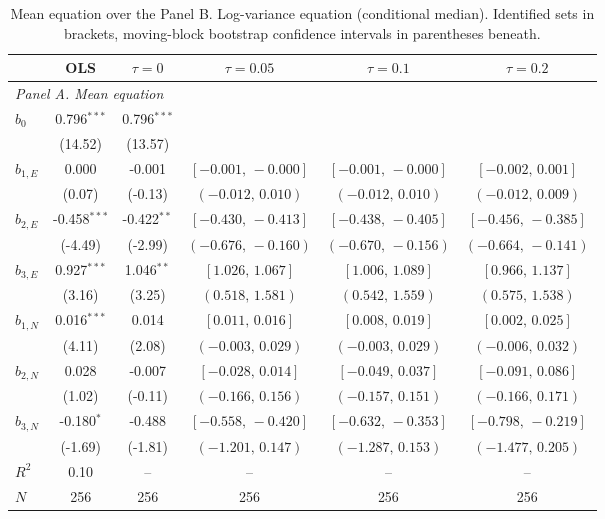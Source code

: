 \documentclass[11pt]{article}
\begin{document}
\begin{table}[!htbp]
\centering
\begin{threeparttable}
\caption{Mean equation over the Panel B. Log-variance equation (conditional median). Identified sets in brackets, moving-block bootstrap confidence intervals in parentheses beneath.}
\label{tab:log_var_eq_panel_lad}
\scriptsize\setlength{\tabcolsep}{3pt}
\begin{tabular}{lccccc}
\toprule
 & OLS & $\tau{=}0$ & $\tau{=}0.05$ & $\tau{=}0.1$ & $\tau{=}0.2$ \\
\midrule
\multicolumn{6}{l}{\textit{Panel A. Mean equation}} \\
\midrule
$b_0$ & 0.796$^{***}$ & 0.796$^{***}$ &  &  &  \\
 & (14.52) & (13.57) &  &  &  \\
$b_{1,E}$ & 0.000 & -0.001 & $[-0.001,\,-0.000]$ & $[-0.001,\,-0.000]$ & $[-0.002,\,0.001]$ \\
 & (0.07) & (-0.13) & $(-0.012,\,0.010)$ & $(-0.012,\,0.010)$ & $(-0.012,\,0.009)$ \\
$b_{2,E}$ & -0.458$^{***}$ & -0.422$^{**}$ & $[-0.430,\,-0.413]$ & $[-0.438,\,-0.405]$ & $[-0.456,\,-0.385]$ \\
 & (-4.49) & (-2.99) & $(-0.676,\,-0.160)$ & $(-0.670,\,-0.156)$ & $(-0.664,\,-0.141)$ \\
$b_{3,E}$ & 0.927$^{***}$ & 1.046$^{**}$ & $[1.026,\,1.067]$ & $[1.006,\,1.089]$ & $[0.966,\,1.137]$ \\
 & (3.16) & (3.25) & $(0.518,\,1.581)$ & $(0.542,\,1.559)$ & $(0.575,\,1.538)$ \\
\midrule
$b_{1,N}$ & 0.016$^{***}$ & 0.014 & $[0.011,\,0.016]$ & $[0.008,\,0.019]$ & $[0.002,\,0.025]$ \\
 & (4.11) & (2.08) & $(-0.003,\,0.029)$ & $(-0.003,\,0.029)$ & $(-0.006,\,0.032)$ \\
$b_{2,N}$ & 0.028 & -0.007 & $[-0.028,\,0.014]$ & $[-0.049,\,0.037]$ & $[-0.091,\,0.086]$ \\
 & (1.02) & (-0.11) & $(-0.166,\,0.156)$ & $(-0.157,\,0.151)$ & $(-0.166,\,0.171)$ \\
$b_{3,N}$ & -0.180$^{*}$ & -0.488 & $[-0.558,\,-0.420]$ & $[-0.632,\,-0.353]$ & $[-0.798,\,-0.219]$ \\
 & (-1.69) & (-1.81) & $(-1.201,\,0.147)$ & $(-1.287,\,0.153)$ & $(-1.477,\,0.205)$ \\
\midrule
$R^2$ & 0.10 & -- & -- & -- & -- \\
$N$ & 256 & 256 & 256 & 256 & 256 \\

\end{tabular}
\end{threeparttable}
\end{table}
\end{document}
